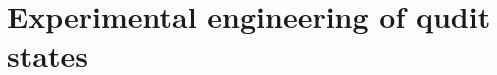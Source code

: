 
\chapter{Experimental engineering of qudit states}
\label{chapter:experimental_engineering_qudits}




